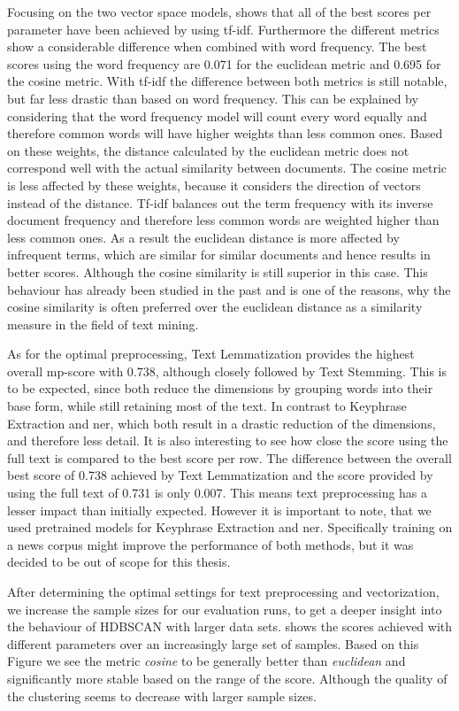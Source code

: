 Focusing on the two vector space models,
shows that all of the best scores per parameter have been achieved by using tf-idf.
Furthermore the different metrics show a considerable difference when combined with word frequency.
The best scores using the word frequency are 0.071 for the euclidean metric and 0.695 for the cosine metric.
With tf-idf the difference between both metrics is still notable, but far less drastic than based on word frequency.
This can be explained by considering that the word frequency model will count every word equally
and therefore common words will have higher weights than less common ones.
Based on these weights, the distance calculated by the euclidean metric does not correspond well
with the actual similarity between documents.
The cosine metric is less affected by these weights,
because it considers the direction of vectors instead of the distance.
Tf-idf balances out the term frequency with its inverse document frequency
and therefore less common words are weighted higher than less common ones.
As a result the euclidean distance is more affected by infrequent terms,
which are similar for similar documents and hence results in better scores.
Although the cosine similarity is still superior in this case.
This behaviour has already been studied in the past\cite{Strehl00impactof, similarity_measures}
and is one of the reasons, why the cosine similarity is often preferred over the euclidean distance
as a similarity measure in the field of text mining.

As for the optimal preprocessing, Text Lemmatization provides the highest overall mp-score with 0.738,
although closely followed by Text Stemming.
This is to be expected, since both reduce the dimensions
by grouping words into their base form, while still retaining most of the text.
In contrast to Keyphrase Extraction and \Gls{ner}, which both result in a drastic reduction of the dimensions,
and therefore less detail.
It is also interesting to see how close the score using the full text is compared to the best score per row.
The difference between the overall best score of 0.738 achieved by Text Lemmatization
and the score provided by using the full text of 0.731 is only 0.007.
This means text preprocessing has a lesser impact than initially expected.
However it is important to note, that we used pretrained models for Keyphrase Extraction and \Gls{ner}.
Specifically training on a news corpus might improve the performance of both methods,
but it was decided to be out of scope for this thesis.

After determining the optimal settings for text preprocessing and vectorization,
we increase the sample sizes for our evaluation runs,
to get a deeper insight into the behaviour of HDBSCAN with larger data sets.
 shows the scores achieved with different parameters
over an increasingly large set of samples.
Based on this Figure we see the metric \textit{cosine} to be generally better than \textit{euclidean}
and significantly more stable based on the range of the score.
Although the quality of the clustering seems to decrease with larger sample sizes.

